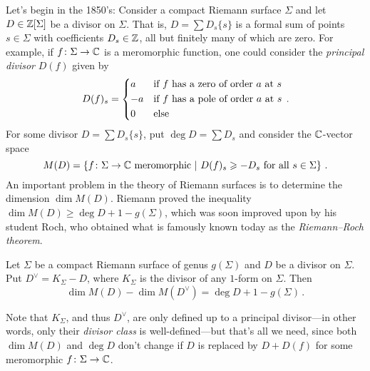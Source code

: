 	Let's begin in the 1850's: Consider a compact Riemann surface $\Sigma$ and let $D\in\mathbb{Z}[\Sigma]$ be a divisor on $\Sigma$. That is, $D=\sum D_s\{s\}$ is a formal sum of points $s\in\Sigma$ with coefficients $D_s\in\mathbb{Z}$, all but finitely many of which are zero. For example, if $f\colon \Sigma\morphism \IC$ is a meromorphic function, one could consider the \emph{principal divisor} $D(f)$ given by
	\begin{equation*}
		D(f)_s=\begin{cases*}
			a & if $f$ has a zero of order $a$ at $s$\\
			-a & if $f$ has a pole of order $a$ at $s$\\
			0 & else
		\end{cases*}\,.
	\end{equation*}
	For some divisor $D=\sum D_s\{s\}$, put $\deg D=\sum D_s$ and consider the $\mathbb{C}$-vector space
	\begin{equation*}
		M(D)=\left\{f\colon \Sigma\rightarrow\mathbb{C}\text{ meromorphic}\ \middle|\  D(f)_s\geqslant -D_s\text{ for all }s\in\Sigma\right\}\,.
	\end{equation*}
	An important problem in the theory of Riemann surfaces is to determine the dimension $\dim M(D)$. Riemann proved the inequality $\dim M(D)\geq \deg D+1-g(\Sigma)$, which was soon improved upon by his student Roch, who obtained what is famously known today as the \emph{Riemann--Roch theorem}.
	\begin{thm}\label{thm:RiemannRoch}
		Let $\Sigma$ be a compact Riemann surface of genus $g(\Sigma)$ and $D$ be a divisor on $\Sigma$. Put $D^\vee=K_\Sigma-D$, where $K_\Sigma$ is the divisor of any $1$-form on $\Sigma$. Then
		\begin{equation*}
			\dim M(D)-\dim M(D^\vee)=\deg D+1-g(\Sigma)\,.
		\end{equation*}
	\end{thm}
	Note that $K_\Sigma$, and thus $D^\vee$, are only defined up to a principal divisor---in other words, only their \emph{divisor class} is well-defined---but that's all we need, since both $\dim M(D)$ and $\deg D$ don't change if $D$ is replaced by $D+D(f)$ for some meromorphic $f\colon \Sigma\morphism\IC$. 
	
